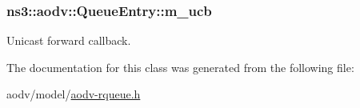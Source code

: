 \subsubsection[{\texorpdfstring{m\+\_\+ucb}{m_ucb}}]{ ns3\+::aodv\+::\+Queue\+Entry\+::m\+\_\+ucb\hspace{0.3cm}{\ttfamily [private]}}\hypertarget{classns3_1_1aodv_1_1QueueEntry_a8a5004adc9896b80d3a844ab6d76f95e}{}\label{classns3_1_1aodv_1_1QueueEntry_a8a5004adc9896b80d3a844ab6d76f95e}


Unicast forward callback. 



The documentation for this class was generated from the following file\+:\begin{DoxyCompactItemize}
\item 
aodv/model/\hyperlink{aodv-rqueue_8h}{aodv-\/rqueue.\+h}\end{DoxyCompactItemize}
